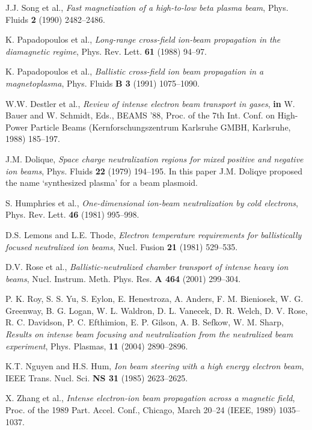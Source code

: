 \documentclass [12pt,a4paper,     ]{report} %
\begin{document}
\begin{enumerate}
 J.J. Song et al., \emph{Fast magnetization of a high-to-low beta plasma beam}, Phys. Fluids {\bf 2} (1990) 2482--2486.

 K. Papadopoulos et al., \emph{Long-range cross-field ion-beam propagation in the diamagnetic regime}, Phys. Rev. Lett. {\bf 61} (1988) 94--97.

 K. Papadopoulos et al., \emph{Ballistic cross-field ion beam propagation in a magnetoplasma}, Phys. Fluids {\bf B 3} (1991) 1075--1090.

 W.W. Destler et al., \emph{Review of intense electron beam transport in gases},  {\bf in} W. Bauer and W. Schmidt, Eds., BEAMS '88, Proc. of the 7th Int. Conf. on High-Power Particle Beams (Kernforschungszentrum Karlsruhe GMBH, Karlsruhe, 1988) 185--197.

 J.M. Dolique, \emph{Space charge neutralization regions for mixed positive and negative ion beams}, Phys. Fluids {\bf 22} (1979) 194--195.  In this paper J.M. Doliqye proposed the name `synthesized plasma' for a beam plasmoid.

 S. Humphries et al., \emph{One-dimensional ion-beam neutralization by cold electrons}, Phys. Rev. Lett. {\bf 46} (1981) 995--998.

 D.S. Lemons and L.E. Thode, \emph{Electron temperature requirements for ballistically focused neutralized ion beams}, Nucl. Fusion {\bf 21} (1981) 529--535.

 D.V. Rose et al., \emph{Ballistic-neutralized chamber transport of intense heavy ion beams}, Nucl. Instrum. Meth. Phys. Res. {\bf A 464} (2001) 299--304.

 P. K. Roy, S. S. Yu, S. Eylon, E. Henestroza, A. Anders, F. M. Bieniosek, W. G. Greenway, B. G. Logan, W. L. Waldron, D. L. Vanecek, D. R. Welch, D. V. Rose, R. C. Davidson, P. C. Efthimion, E. P. Gilson, A. B. Sefkow, W. M. Sharp,  \emph{Results on intense beam focusing and neutralization from the neutralized beam experiment},  Phys. Plasmas, {\bf 11} (2004) 2890--2896.

 K.T. Nguyen and H.S. Hum, \emph{Ion beam steering with a high energy electron beam}, IEEE Trans. Nucl. Sci. {\bf NS 31} (1985) 2623--2625.

 X. Zhang et al., \emph{Intense electron-ion beam propagation across a magnetic field}, Proc. of the 1989 Part. Accel. Conf., Chicago, March 20--24 (IEEE, 1989) 1035--1037.



\end{enumerate}
\end{document}
